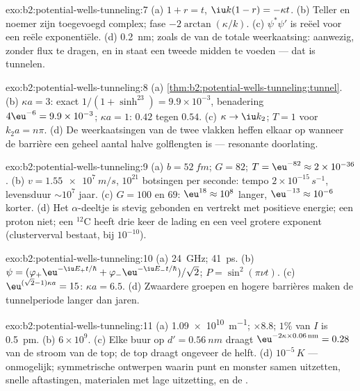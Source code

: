 \begin{solution}{exo:b2:potential-wells-tunneling:7}
(a) $1 + r = t$, $\iu k(1 - r) = -\kappa t$. (b) Teller en noemer
zijn toegevoegd complex; fase $-2\arctan(\kappa/k)$. (c) $\psi^*\psi'$ is
reëel voor een
reële exponentiële. (d) \qty{0.2}{nm}; zoals de  van de totale
weerkaatsing: aanwezig, zonder flux te dragen, en in staat een tweede midden
te voeden
--- dat is tunnelen.
\end{solution}

\begin{solution}{exo:b2:potential-wells-tunneling:8}
(a) \cref{thm:b2:potential-wells-tunneling:tunnel}. (b) $\kappa a = 3$:
exact $1/(1 + \sinh^23) = 9.9 \times 10^{-3}$, benadering
$4\eu^{-6} = 9.9 \times
10^{-3}$; $\kappa a = 1$: $0.42$ tegen $0.54$. (c)
$\kappa \to \iu k_2$; $T = 1$
voor $k_2a = n\pi$. (d) De weerkaatsingen van de twee vlakken heffen elkaar
op wanneer de
barrière een geheel aantal halve golflengten is --- resonante
doorlating.
\end{solution}

\begin{solution}{exo:b2:potential-wells-tunneling:9}
(a) $b = \qty{52}{fm}$; $G = 82$; $T = \eu^{-82} \approx 2 \times 10^{-36}$.
(b) $v =
\qty{1.55e7}{m/s}$, $10^{21}$ botsingen per seconde: tempo
$2 \times 10^{-15}\,\unit{s^{-1}}$,
levensduur $\sim 10^7$ jaar. (c) $G = 100$ en $69$: $\eu^{18} \approx 10^8$ langer,
$\eu^{-13} \approx 10^{-6}$ korter. (d) Het $\alpha$-deeltje is stevig
gebonden en vertrekt
met positieve energie; een proton niet; een $^{12}$C heeft drie keer de
lading en een veel grotere exponent (clusterverval bestaat, bij $10^{-10}$).
\end{solution}

\begin{solution}{exo:b2:potential-wells-tunneling:10}
(a) \qty{24}{GHz}; \qty{41}{ps}. (b)
$\psi = (\varphi_+\eu^{-\iu E_+t/\hbar} +
\varphi_-\eu^{-\iu E_-t/\hbar})/\sqrt2$;
$P = \sin^2(\pi\nu t)$. (c) $\eu^{(\sqrt2 - 1)
\kappa a} = 15$:
$\kappa a = 6.5$. (d) Zwaardere groepen en hogere barrières maken
de tunnelperiode langer dan jaren.
\end{solution}

\begin{solution}{exo:b2:potential-wells-tunneling:11}
(a) \qty{1.09e10}{m^{-1}}; $\times 8.8$; $1\%$ van $I$ is \qty{0.5}{pm}. (b)
$6 \times 10^9$.
(c) Elke buur op $d' = \qty{0.56}{nm}$ draagt
$\eu^{-2\kappa \times 0.06\,\text{nm}}
= 0.28$ van de stroom van de top; de
top draagt ongeveer de helft. (d)
$10^{-5}\,\unit{K}$ --- onmogelijk; symmetrische ontwerpen waarin punt en monster
samen uitzetten, snelle aftastingen, materialen met lage uitzetting, en de
.
\end{solution}

